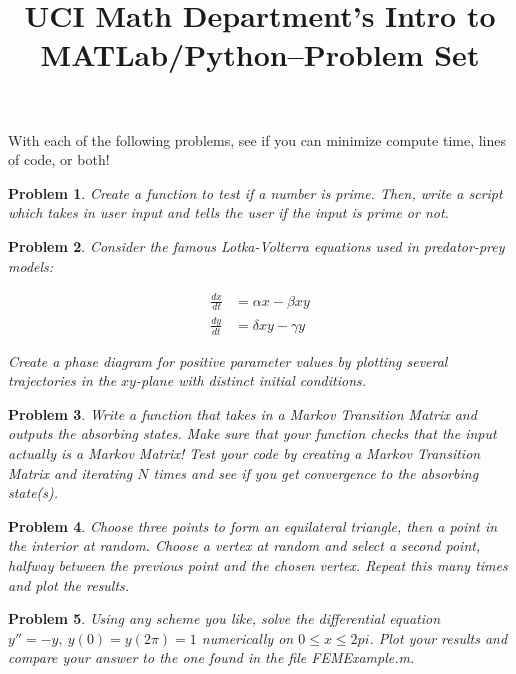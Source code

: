 \documentclass{article}
\newtheorem{problem}{Problem}
\begin{document}
\title{UCI Math Department's Intro to MATLab/Python--Problem Set}
\maketitle

With each of the following problems, see if you can minimize compute time, lines of code, or both!

\begin{problem}
Create a function to test if a number is prime. Then, write a script which takes in user input and tells the user if the input is prime or not.
\end{problem}

\begin{problem}
Consider the famous Lotka-Volterra equations used in predator-prey models:

\begin{align*}
\frac{dx}{dt} & = \alpha x - \beta xy \\
\frac{dy}{dt} & = \delta xy - \gamma y
\end{align*}

Create a phase diagram for positive parameter values by plotting several trajectories in the $xy$-plane with distinct initial conditions.

\end{problem}

\begin{problem}

Write a function that takes in a Markov Transition Matrix and outputs the absorbing states.
Make sure that your function checks that the input actually is a Markov Matrix!
Test your code by creating a Markov Transition Matrix and iterating $N$ times and see if you get convergence to the absorbing state(s).

\end{problem}

\begin{problem}

Choose three points to form an equilateral triangle, then a point in the interior at random.  Choose a vertex at random and select a second point, halfway between the previous point and the chosen vertex.  Repeat this many times and plot the results.

\end{problem}

\begin{problem}

Using any scheme you like, solve the differential equation $y'' = -y,\ y(0) = y(2\pi) = 1$ numerically on $0 \le x \le 2pi$.  Plot your results and compare your answer to the one found in the file FEMExample.m.

\end{problem}
\end{document}
